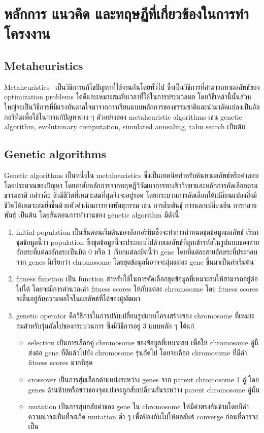 \section{หลักการ แนวคิด และทฤษฏีที่เกี่ยวข้องในการทำโครงงาน }
\subsection{Metaheuristics}
Meta­heuristics~\cite{metaheuris} เป็นวิธีการแก้ไขปัญหาที่ใช้งานกันโดยทั่วไป ซึ่งเป็นวิธีการที่สามารถหาผลลัพธ์ของ optimization problems ได้ดีและเหมาะสมกับเวลาที่ใช้ในการประมวลผล
โดยวิธีเหล่านี้นั้นส่วนใหญ่จะเป็นวิธีการที่มีแรงบันดาลใจมาจากการเรียนแบบหลักการของธรรมชาติและนำมาดัดแปลงเป็นอัลกอริทึมเพื่อใช้ในการแก้ปัญหาต่าง ๆ ตัวอย่างของ metaheuristic algorithms เช่น genetic algorithm, evolutionary computation, simulated annealing, tabu search เป็นต้น
\subsection{Genetic algorithms}
Genetic algorithms เป็นหนึ่งใน metaheuristics ซึ่งเป็นเทคนิคสำหรับค้นหาผลลัพธ์หรือคำตอบโดยประมาณของปัญหา โดยอาศัยหลักการจากทฤษฎีวิวัฒนาการทางชีววิทยาและหลักการคัดเลือกตามธรรมชาติ 
\linebreak กล่าวคือ สิ่งมีชีวิตที่เหมาะสมที่สุดจึงจะอยู่รอด \cite{ga} โดยกระบวนการคัดเลือกได้เปลี่ยนแปลงสิ่งมีชีวิตให้เหมาะสมยิ่งขึ้นด้วยตัวดำเนินการทางพันธุกรรม เช่น การสืบพันธุ์ การแลกเปลี่ยนยีน การกลายพันธุ์ เป็นต้น โดยขั้นตอนการทำงานของ genetic algorithm มีดังนี้ 
\begin{enumerate}
  \item initial population เป็นขั้นตอนเริ่มต้นของอัลกอริทึมซึ่งจะทำการกำหนดชุดข้อมูลผลลัพธ์ เรียกชุดข้อมูลนี้ว่า population ซึ่งชุดข้อมูลนี้จะประกอบไปด้วยผลลัพธ์ที่ถูกเข้ารหัสในรูปแบบของสายอักขระที่แต่ละอักขระเป็นบิต 0 หรือ 1 เรียกแต่ละบิตนี้ว่า gene
  โดยที่แต่ละสายอักขระที่ประกอบจาก genes นี้เรียกว่า chromosome โดยชุดข้อมูลนี้อาจจะสุ่มแต่ละ gene ขึ้นมาเป็นค่าเริ่มต้น
  \item fitness function เป็น function สำหรับใช้ในการคัดเลือกชุดข้อมูลที่เหมาะสมให้สามารถอยู่ต่อไปได้ โดยจะมีการคำนวณค่า fitness scores ให้กับแต่ละ chromosome
  โดย fitness scores จะขึ้นอยู่กับความพอใจในผลลัพธ์ที่ได้ของผู้พัฒนา
  \item genetic operator คือวิธีการในการปรับเปลี่ยนรูปแบบโครงสร้างของ chromosome ที่เหมาะสมสำหรับรุ่นถัดไปของกระบวนการ ซึ่งมีวิธีการอยู่ 3 แบบหลัก ๆ ได้แก่
  \begin{itemize}
  \item selection เป็นการเลือกคู่ chromosome ของข้อมูลที่เหมาะสม เพื่อให้ chromosome คู่นี้ส่งต่อ gene ที่ดีแล้วไปยัง chromosome รุ่นถัดไป โดยจะเลือก chromosome ที่มีค่า fitness scores มากที่สุด
  \item crossover เป็นการสุ่มเลือกตำแหน่งระหว่าง genes จาก parent chromosome 1 คู่ โดย genes ด้านซ้ายหรือขวาของจุดแบ่งจะถูกสับเปลี่ยนกันระหว่าง parent chromosome คู่นั้น
  \item mutation เป็นการสุ่มกลับค่าของ gene ใน chromosome ให้มีค่าตรงกันข้ามโดยมีค่าความน่าจะเป็นที่จะเกิด mutation ต่ำ ๆ เพื่อป้องกันไม่ให้ผลลัพธ์ converge ก่อนที่ควรจะเป็น
\end{itemize}
\end{enumerate}
